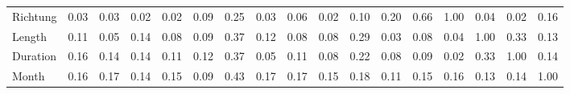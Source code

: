 \begin{tabular}{lrrrrrrrrrrrrrrrr}
Richtung &  0.03 &  0.03 &  0.02 &  0.02 &   0.09 &   0.25 & 0.03 &   0.06 &   0.02 & 0.10 & 0.20 &    0.66 &      1.00 &    0.04 &      0.02 &   0.16 \\
Length   &  0.11 &  0.05 &  0.14 &  0.08 &   0.09 &   0.37 & 0.12 &   0.08 &   0.08 & 0.29 & 0.03 &    0.08 &      0.04 &    1.00 &      0.33 &   0.13 \\
Duration &  0.16 &  0.14 &  0.14 &  0.11 &   0.12 &   0.37 & 0.05 &   0.11 &   0.08 & 0.22 & 0.08 &    0.09 &      0.02 &    0.33 &      1.00 &   0.14 \\
Month    &  0.16 &  0.17 &  0.14 &  0.15 &   0.09 &   0.43 & 0.17 &   0.17 &   0.15 & 0.18 & 0.11 &    0.15 &      0.16 &    0.13 &      0.14 &   1.00 \\
\bottomrule
\end{tabular}
